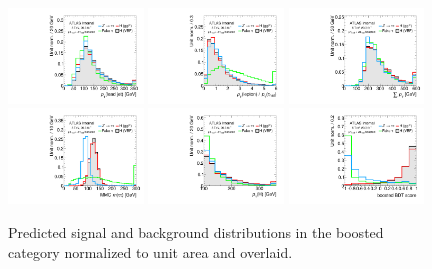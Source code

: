 \begin{figure}[tp]
  \centering
  \includegraphics[width=0.32\textwidth]{figures/overlaid/boost/jet-1-pt}
  \includegraphics[width=0.32\textwidth]{figures/overlaid/boost/taulep-ptratio}
  \includegraphics[width=0.32\textwidth]{figures/overlaid/boost/sumpt} \\
  \includegraphics[width=0.32\textwidth]{figures/overlaid/boost/mMMC}
  \includegraphics[width=0.32\textwidth]{figures/overlaid/boost/H-pt-hi}
  \includegraphics[width=0.32\textwidth]{figures/overlaid/boost/BDTEve-boost} \\
  \caption{Predicted signal and background distributions in the boosted category normalized to unit area and overlaid.}
  \label{fig:strategy-overlaid-boost-2}
\end{figure}


